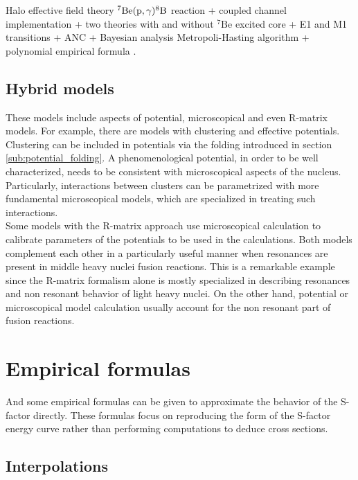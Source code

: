 \documentclass[openany]{book}
\begin{document}
 Halo effective field theory $\mathrm{{}^{7}Be(p, \gamma){}^{8}B}$ reaction + coupled channel implementation + two theories with and without $\mathrm{{}^{7}Be}$ excited core  + E1 and M1 transitions + ANC + Bayesian analysis Metropoli-Hasting algorithm + polynomial empirical formula  \cite{higa_premarathna_rupak_2022}. \\

\subsection{Hybrid models} \label{sub:special_hybrid}

These models include aspects of potential, microscopical and even R-matrix models. For example, there are models with clustering and effective potentials. \\

Clustering can be included in potentials via the folding introduced in section \ref{sub:potential_folding}. A phenomenological potential, in order to be well characterized, needs to be consistent with microscopical aspects of the nucleus.  Particularly, interactions between clusters can be parametrized with more fundamental microscopical models, which are specialized in treating such interactions. \\

Some models with the R-matrix approach use microscopical calculation to calibrate parameters of the potentials to be used in the calculations. Both models complement each other in a particularly useful manner when resonances are present in middle heavy nuclei fusion reactions. This is a remarkable example since the R-matrix formalism alone is mostly specialized in describing resonances and non resonant behavior of light heavy nuclei. On the other hand, potential or microscopical model calculation usually account for the non resonant part of fusion reactions. \\

\section{Empirical formulas} \label{sec:empiricalFormulas}

And some empirical formulas can be given to approximate the behavior of the S-factor directly. These formulas focus on reproducing the form of the S-factor energy curve rather than performing computations to deduce cross sections.

\subsection{Interpolations} \label{sub:empirical_interpolation}
\end{document}
